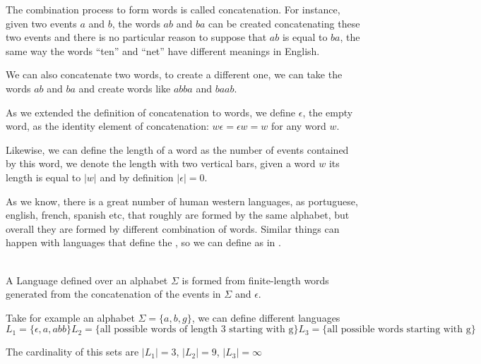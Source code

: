 The combination process to form words is called concatenation. For instance,
given two events $a$ and $b$, the words $ab$ and $ba$ can be created
concatenating these two events and there is no particular reason to suppose that
$ab$ is equal to $ba$, the same way the words ``ten'' and ``net'' have different
meanings in English.

We can also concatenate two words, to create a different one, we can take the
words $ab$ and $ba$ and create words like $abba$ and $baab$.

As we extended the definition of concatenation to words, we define $\epsilon$,
the empty word, as the identity element of concatenation: $w\epsilon = \epsilon
w = w$ for any word $w$.

Likewise, we can define the length of a word as the number of events contained
by this word, we denote the length with two vertical bars, given a word $w$ its
length is equal to $|w|$ and by definition $|\epsilon| = 0 $.

As we know, there is a great number of human western languages, as portuguese,
english, french, spanish etc, that roughly are formed by the same alphabet, but
overall they are formed by different combination of words. Similar things can
happen with languages that define the \DESs, so we can define as in
\cite{cassandras2009introduction}. \pagebreak
\begin{definition}[Language]
  \label{def:language}~\\
  A Language defined over an alphabet $\Sigma$ is formed from finite-length
  words generated from the concatenation of the events in $\Sigma$ and
  $\epsilon$.
\end{definition}

Take for example an alphabet $\Sigma = \{a,b,g\}$, we can define different
languages
\begin{subequations}
  \begin{equation*}
  L_1=\{\epsilon, a, abb\}
  \end{equation*}
  \begin{equation*}
  L_2=\{\text{all possible words of length 3 starting with g}\}
  \end{equation*}
  \begin{equation*}
  L_3=\{\text{all possible words starting with g}\}
  \end{equation*}
\end{subequations}

The cardinality of this sets are $|L_1|=3$, $|L_2|=9$, $|L_3|=\infty$


